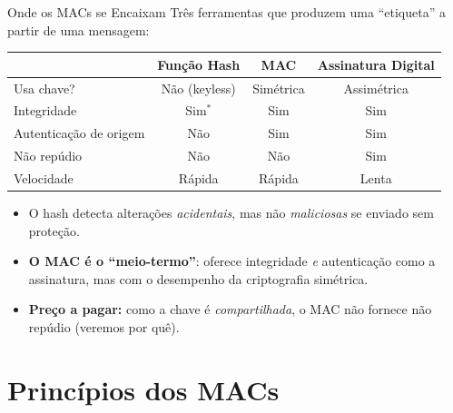 \documentclass{beamer}
\begin{document}
\begin{frame}{Onde os MACs se Encaixam}
    Três ferramentas que produzem uma ``etiqueta'' a partir de uma mensagem:
    \medskip
    \begin{center}
        \small
        \begin{tabular}{lccc}
            \toprule
            & \textbf{Função Hash} & \textbf{MAC} & \textbf{Assinatura Digital} \\
            \midrule
            Usa chave?            & \cellcolor{red!12}Não (keyless) & \cellcolor{green!12}Simétrica & \cellcolor{green!12}Assimétrica \\
            Integridade           & \cellcolor{green!12}Sim$^\ast$ & \cellcolor{green!12}Sim & \cellcolor{green!12}Sim \\
            Autenticação de origem& \cellcolor{red!12}Não & \cellcolor{green!12}Sim & \cellcolor{green!12}Sim \\
            Não repúdio           & \cellcolor{red!12}Não & \cellcolor{red!12}\alert{Não} & \cellcolor{green!12}Sim \\
            Velocidade            & \cellcolor{green!12}Rápida & \cellcolor{green!12}Rápida & \cellcolor{red!12}Lenta \\
            \bottomrule
        \end{tabular}
    \end{center}
    \medskip
    \begin{itemize}
        \footnotesize
        \item[$\ast$] O hash detecta alterações \emph{acidentais}, mas não \emph{maliciosas} se enviado sem proteção.
        \item \textbf{O MAC é o ``meio-termo''}: oferece integridade \emph{e} autenticação como a assinatura, mas com o desempenho da criptografia simétrica.
        \item \textbf{Preço a pagar:} como a chave é \emph{compartilhada}, o MAC \alert{não fornece não repúdio} (veremos por quê).
    \end{itemize}
\end{frame}

\section{Princípios dos MACs}
\end{document}
